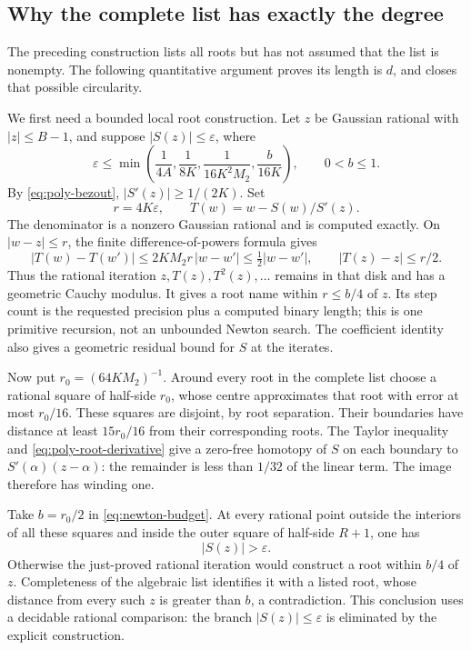\subsection{Why the complete list has exactly the degree}

The preceding construction lists all roots but has not assumed that the
list is nonempty. The following quantitative argument proves its length
is $d$, and closes that possible circularity.

We first need a bounded local root construction. Let $z$ be Gaussian
rational with $|z|\le B-1$, and suppose $|S(z)|\le\varepsilon$, where
\begin{equation}
 \varepsilon\le\min\left(
       \frac1{4A},\frac1{8K},\frac1{16K^2M_2},
       \frac b{16K}\right),\qquad 0<b\le1.              \label{eq:newton-budget}
\end{equation}
By \eqref{eq:poly-bezout}, $|S'(z)|\ge1/(2K)$. Set
\[
        r=4K\varepsilon,\qquad
        T(w)=w-S(w)/S'(z).
\]
The denominator is a nonzero Gaussian rational and is computed exactly.
On $|w-z|\le r$, the finite difference-of-powers formula gives
\[
 |T(w)-T(w')|\le2KM_2r\,|w-w'|\le\tfrac12|w-w'|,
       \qquad |T(z)-z|\le r/2.
\]
Thus the rational iteration $z,T(z),T^2(z),\ldots$ remains in that
disk and has a geometric Cauchy modulus. It gives a root name within
$r\le b/4$ of $z$. Its step count is the requested precision plus a
computed binary length; this is one primitive recursion, not an unbounded
Newton search. The coefficient identity also gives a geometric residual
bound for $S$ at the iterates.

Now put $r_0=(64KM_2)^{-1}$. Around every root in the complete list choose
a rational square of half-side $r_0$, whose centre approximates that root
with error at most $r_0/16$. These squares are disjoint, by root separation.
Their boundaries have distance at least $15r_0/16$ from their corresponding
roots. The Taylor inequality and \eqref{eq:poly-root-derivative} give a
zero-free homotopy of $S$ on each boundary to
$S'(\alpha)(z-\alpha)$: the remainder is less than $1/32$ of the linear
term. The image therefore has winding one.

Take $b=r_0/2$ in \eqref{eq:newton-budget}. At every rational point outside
the interiors of all these squares and inside the outer square of
half-side $R+1$, one has
\begin{equation}
                              |S(z)|>\varepsilon.       \label{eq:poly-outside-lower}
\end{equation}
Otherwise the just-proved rational iteration would construct a root within
$b/4$ of $z$. Completeness of the algebraic list identifies it with a listed
root, whose distance from every such $z$ is greater than $b$, a contradiction.
This conclusion uses a decidable rational comparison: the branch
$|S(z)|\le\varepsilon$ is eliminated by the explicit construction.

